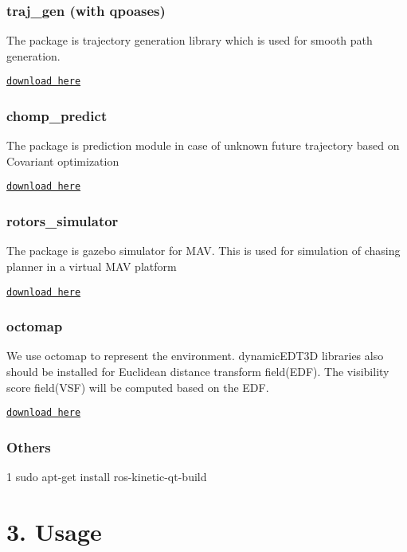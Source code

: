 \subsubsection*{traj\+\_\+gen (with qpoases)}

The package is trajectory generation library which is used for smooth path generation.

\href{https://github.com/icsl-Jeon/traj_gen}{\tt download here}

\subsubsection*{chomp\+\_\+predict}

The package is prediction module in case of unknown future trajectory based on Covariant optimization

\href{https://github.com/icsl-Jeon/chomp_predict}{\tt download here}

\subsubsection*{rotors\+\_\+simulator}

The package is gazebo simulator for M\+AV. This is used for simulation of chasing planner in a virtual M\+AV platform

\href{https://github.com/ethz-asl/rotors_simulator}{\tt download here}

\subsubsection*{octomap}

We use octomap to represent the environment. dynamic\+E\+D\+T3D libraries also should be installed for Euclidean distance transform field(\+E\+D\+F). The visibility score field(\+V\+S\+F) will be computed based on the E\+DF.

\href{http://github.com/OctoMap/octomap}{\tt download here}

\subsubsection*{Others}


\begin{DoxyCode}
1 sudo apt-get install ros-kinetic-qt-build
\end{DoxyCode}


\section*{3. Usage}

